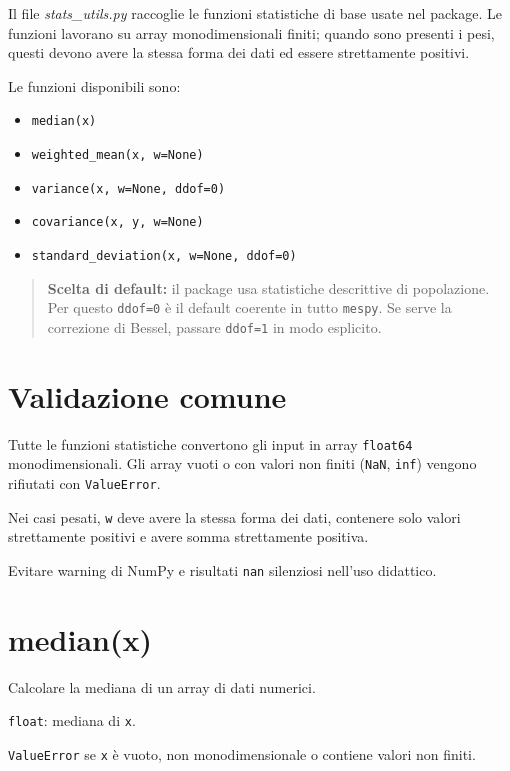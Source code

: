 Il file \textit{stats\_utils.py} raccoglie le funzioni statistiche di base usate nel package. Le funzioni lavorano su array monodimensionali finiti; quando sono presenti i pesi, questi devono avere la stessa forma dei dati ed essere strettamente positivi.

Le funzioni disponibili sono:
\begin{itemize}
    \item \texttt{median(x)}
    \item \texttt{weighted\_mean(x, w=None)}
    \item \texttt{variance(x, w=None, ddof=0)}
    \item \texttt{covariance(x, y, w=None)}
    \item \texttt{standard\_deviation(x, w=None, ddof=0)}
\end{itemize}

\begin{quote}
\textbf{Scelta di default:} il package usa statistiche descrittive di popolazione. Per questo \texttt{ddof=0} è il default coerente in tutto \texttt{mespy}. Se serve la correzione di Bessel, passare \texttt{ddof=1} in modo esplicito.
\end{quote}

\section{Validazione comune}
\begin{apidesc}
  \item[\textbf{Contratto}]
    Tutte le funzioni statistiche convertono gli input in array \texttt{float64} monodimensionali. Gli array vuoti o con valori non finiti (\texttt{NaN}, \texttt{inf}) vengono rifiutati con \texttt{ValueError}.
  \item[\textbf{Pesi}]
    Nei casi pesati, \texttt{w} deve avere la stessa forma dei dati, contenere solo valori strettamente positivi e avere somma strettamente positiva.
  \item[\textbf{Obiettivo}]
    Evitare warning di NumPy e risultati \texttt{nan} silenziosi nell'uso didattico.
\end{apidesc}

\section{median(x)}
\label{sec:median}
\begin{apidesc}
  \item[\textbf{Scopo}]
    Calcolare la mediana di un array di dati numerici.
  \item[\textbf{Restituisce}]
    \texttt{float}: mediana di \texttt{x}.
  \item[\textbf{Eccezioni}]
    \texttt{ValueError} se \texttt{x} è vuoto, non monodimensionale o contiene valori non finiti.
\end{apidesc}

